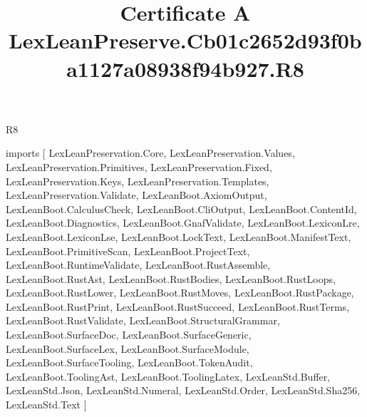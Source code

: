 \begin{lexlean}{R8}
\title{Certificate A LexLeanPreserve.Cb01c2652d93f0ba1127a08938f94b927.R8}
\begin{coremodule}
imports [
  LexLeanPreservation.Core,
  LexLeanPreservation.Values,
  LexLeanPreservation.Primitives,
  LexLeanPreservation.Fixed,
  LexLeanPreservation.Keys,
  LexLeanPreservation.Templates,
  LexLeanPreservation.Validate,
  LexLeanBoot.AxiomOutput,
  LexLeanBoot.CalculusCheck,
  LexLeanBoot.CliOutput,
  LexLeanBoot.ContentId,
  LexLeanBoot.Diagnostics,
  LexLeanBoot.GnafValidate,
  LexLeanBoot.LexiconLre,
  LexLeanBoot.LexiconLse,
  LexLeanBoot.LockText,
  LexLeanBoot.ManifestText,
  LexLeanBoot.PrimitiveScan,
  LexLeanBoot.ProjectText,
  LexLeanBoot.RuntimeValidate,
  LexLeanBoot.RustAssemble,
  LexLeanBoot.RustAst,
  LexLeanBoot.RustBodies,
  LexLeanBoot.RustLoops,
  LexLeanBoot.RustLower,
  LexLeanBoot.RustMoves,
  LexLeanBoot.RustPackage,
  LexLeanBoot.RustPrint,
  LexLeanBoot.RustSucceed,
  LexLeanBoot.RustTerms,
  LexLeanBoot.RustValidate,
  LexLeanBoot.StructuralGrammar,
  LexLeanBoot.SurfaceDoc,
  LexLeanBoot.SurfaceGeneric,
  LexLeanBoot.SurfaceLex,
  LexLeanBoot.SurfaceModule,
  LexLeanBoot.SurfaceTooling,
  LexLeanBoot.TokenAudit,
  LexLeanBoot.ToolingAst,
  LexLeanBoot.ToolingLatex,
  LexLeanStd.Buffer,
  LexLeanStd.Json,
  LexLeanStd.Numeral,
  LexLeanStd.Order,
  LexLeanStd.Sha256,
  LexLeanStd.Text
]


\end{coremodule}
\end{lexlean}
